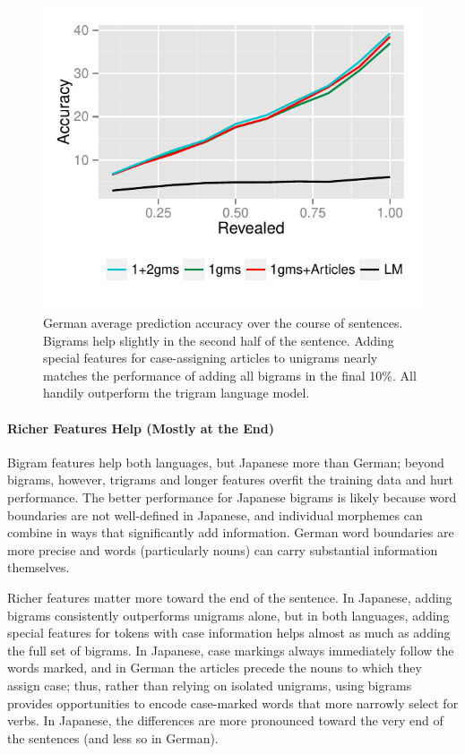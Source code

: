 \begin{figure}[t!]
 \begin{center} \includegraphics[width=1.0\linewidth]{2016_conll_verbpred/figures/german_top50_comparison}
\caption{German average prediction accuracy over the course of
  sentences. Bigrams help slightly in the second half of the sentence.
  Adding special features for case-assigning articles to unigrams
  nearly matches the performance of adding all bigrams in the final
  10\%. All handily outperform the trigram language
  model.}  \label{fig:german_unibi} \end{center}
\end{figure}

\paragraph{Richer Features Help (Mostly at the End)}

Bigram features help both languages, but Japanese more than German;
beyond bigrams, however, trigrams and longer features overfit the
training data and hurt performance.  The better performance for
Japanese bigrams is likely because word boundaries are not
well-defined in Japanese, and individual morphemes can combine in ways
that significantly add information.  German word boundaries are more
precise and words (particularly nouns) can carry substantial
information themselves.

Richer features matter more toward the end of the sentence.  In
Japanese, adding bigrams consistently outperforms unigrams alone, but
in both languages, adding special features for tokens with case
information helps almost as much as adding the full set of bigrams.
In Japanese, case markings always immediately follow the words marked,
and in German the articles precede the nouns to which they assign
case; thus, rather than relying on isolated unigrams, using bigrams
provides opportunities to encode case-marked words that more narrowly
select for verbs.  In Japanese, the differences are more pronounced
toward the very end of the sentences (and less so in German).


